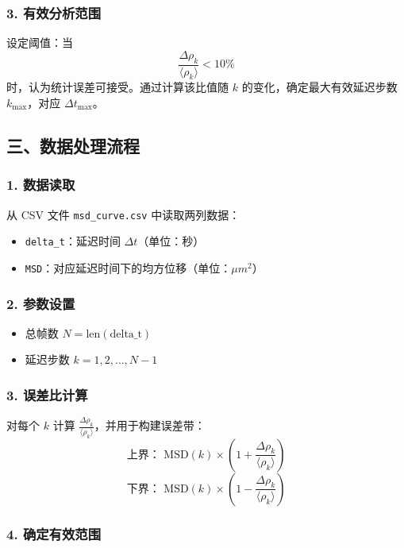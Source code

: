 \documentclass[a4paper]{report} %
\begin{document}
\subsubsection*{3. 有效分析范围}

设定阈值：当 
\[
\frac{\Delta \rho_k}{\langle \rho_k \rangle} < 10\%
\] 
时，认为统计误差可接受。通过计算该比值随 $k$ 的变化，确定最大有效延迟步数 $k_{\text{max}}$，对应 $\Delta t_{\text{max}}$。

\subsection*{三、数据处理流程}

\subsubsection*{1. 数据读取}

从 CSV 文件 \texttt{msd\_curve.csv} 中读取两列数据：
\begin{itemize}
    \item \texttt{delta\_t}：延迟时间 $\Delta t$（单位：秒）
    \item \texttt{MSD}：对应延迟时间下的均方位移（单位：$\mu m^2$）
\end{itemize}

\subsubsection*{2. 参数设置}

\begin{itemize}
    \item 总帧数 $N = \text{len}(\text{delta\_t})$
    \item 延迟步数 $k = 1, 2, \dots, N-1$
\end{itemize}

\subsubsection*{3. 误差比计算}

对每个 $k$ 计算 $\frac{\Delta \rho_k}{\langle \rho_k \rangle}$，并用于构建误差带：
\[
\text{上界： } \text{MSD}(k) \times \left(1 + \frac{\Delta \rho_k}{\langle \rho_k \rangle}\right)
\]
\[
\text{下界： } \text{MSD}(k) \times \left(1 - \frac{\Delta \rho_k}{\langle \rho_k \rangle}\right)
\]

\subsubsection*{4. 确定有效范围}
\end{document}
